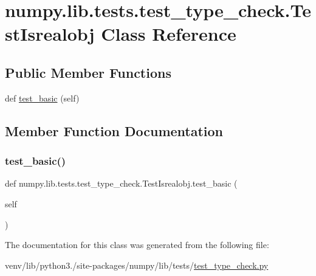 \hypertarget{classnumpy_1_1lib_1_1tests_1_1test__type__check_1_1TestIsrealobj}{}\section{numpy.\+lib.\+tests.\+test\+\_\+type\+\_\+check.\+Test\+Isrealobj Class Reference}
\label{classnumpy_1_1lib_1_1tests_1_1test__type__check_1_1TestIsrealobj}
\subsection*{Public Member Functions}
\begin{DoxyCompactItemize}
\item 
def \hyperlink{classnumpy_1_1lib_1_1tests_1_1test__type__check_1_1TestIsrealobj_a4f2a79eb6f8a7c026b52dcc8898a37b5}{test\+\_\+basic} (self)
\end{DoxyCompactItemize}


\subsection{Member Function Documentation}
\mbox{\label{classnumpy_1_1lib_1_1tests_1_1test__type__check_1_1TestIsrealobj_a4f2a79eb6f8a7c026b52dcc8898a37b5}} 
\subsubsection{\texorpdfstring{test\+\_\+basic()}{test\_basic()}}
{\footnotesize\ttfamily def numpy.\+lib.\+tests.\+test\+\_\+type\+\_\+check.\+Test\+Isrealobj.\+test\+\_\+basic (\begin{DoxyParamCaption}\item[{}]{self }\end{DoxyParamCaption})}



The documentation for this class was generated from the following file\+:\begin{DoxyCompactItemize}
\item 
venv/lib/python3./site-\/packages/numpy/lib/tests/\hyperlink{test__type__check_8py}{test\+\_\+type\+\_\+check.\+py}\end{DoxyCompactItemize}
